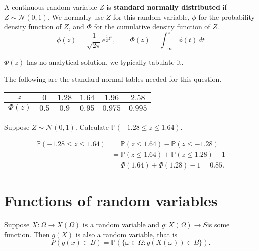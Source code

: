 \begin{definition} 
    A continuous random variable $Z$ is \textbf{standard normally distributed} if $Z \sim \mathcal N(0, 1)$. We normally use $Z$ for this random variable, $\phi$ for the probability density function of $Z$, and $\Phi$ for the cumulative density function of $Z$. \[ \phi(z) = \frac{1}{\sqrt{2 \pi}} e^{\frac12 z^2}, \qquad \Phi(z) = \int_{-\infty}^z \phi(t) \, dt \]
\end{definition}

\begin{remark}
    $\Phi(z)$ has no analytical solution, we typically tabulate it.
\end{remark}

\begin{example}
    The following are the standard normal tables needed for this question.
    \begin{center}
        \begin{tabular}{cccccc}
            \toprule
            $z$ & $0$ & $1.28$ & $1.64$ & $1.96$ & $2.58$ \\
            \midrule
            $\Phi(z)$ & $0.5$ & $0.9$ & $0.95$ & $0.975$ & $0.995$ \\
            \bottomrule
        \end{tabular}
    \end{center}
    Suppose $Z \sim \mathcal N(0, 1)$. Calculate $\mathbb P(-1.28 \leq z \leq 1.64)$.
\end{example}

\begin{solution}
    \begin{align*}
        \mathbb P(-1.28 \leq z \leq 1.64) &= \mathbb P(z \leq 1.64) - \mathbb P(z \leq -1.28) \\
        &= \mathbb P(z \leq 1.64) + \mathbb P(z \leq 1.28) - 1 \\
        &= \Phi(1.64) + \Phi(1.28) - 1 = 0.85.
    \end{align*}
\end{solution}

\section{Functions of random variables}

\begin{theorem}
    Suppose $X : \Omega \to X(\Omega)$ is a random variable and $g : X(\Omega) \to S$is some function. Then $g(X)$ is also a random variable, that is \[ P(g(x) \in B) = \mathbb P(\{\omega \in \Omega : g(X(\omega)) \in B\}). \]
\end{theorem}

